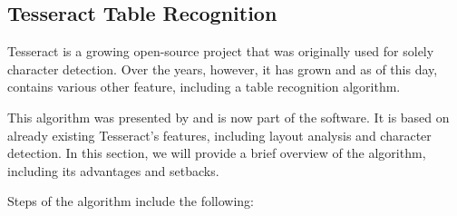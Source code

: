 \subsection{Tesseract Table Recognition}

Tesseract is a growing open-source project that was originally used for solely character detection. Over the years, however, it has grown and as of this day, contains various other feature, including a table recognition algorithm.

This algorithm was presented by \citet{tableDetHeterogeneous} and is now part of the software. It is based on already existing Tesseract's features, including layout analysis  and character detection. In this section, we will provide a brief overview of the algorithm, including its advantages and setbacks.


Steps of the algorithm include the following: 

